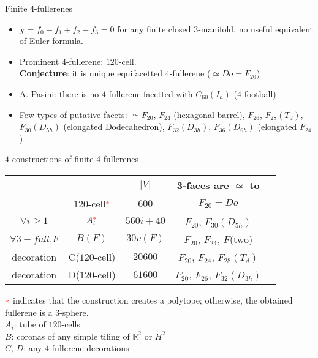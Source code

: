 \documentclass[%
pdf,
colorBG,
slideColor,
]{prosper}
\newcommand{\RR}{\ensuremath{\mathbb{R}}}
\begin{document}
\begin{slide}{Finite $4$-fullerenes}
\begin{itemize}
\item $\chi=f_0-f_1+f_2-f_3=0$ for any finite closed $3$-manifold, no useful equivalent of Euler formula.

\item Prominent $4$-fullerene: $120$-cell.\\
{\bf Conjecture}: it is unique equifacetted $4$-fullerene ($\simeq Do=F_{20}$)

\item A. Pasini: there is no $4$-fullerene facetted with
$C_{60}(I_h)$ ($4$-football)

\item Few types of putative facets: $\simeq
F_{20}$, $F_{24}$ (hexagonal barrel), $F_{26}$, $F_{28}(T_d)$,
$F_{30}(D_{5h})$ (elongated Dodecahedron), $F_{32}(D_{3h})$,
$F_{36}(D_{6h})$ (elongated $F_{24}$)
\end{itemize}
\end{slide}





\begin{slide}{$4$ constructions of finite 4-fullerenes}
\begin{center}
\begin{tabular}{|c|c|c|c|c|}
\hline
     &    &$|V|$&3-faces are $\simeq$ to\\
\hline
     &$120$-cell${}^{\textcolor{red}{*}}$   & $600$   &  $F_{20}=Do$\\
$\forall i\geq 1$
  & $A_i^{\textcolor{red}{*}}$ & $560i+40$   &$F_{20}$, $F_{30}(D_{5h})$\\
$\forall 3-full. F$ & $B(F)$ & $30 v(F)$  &$F_{20}$, $F_{24}$, $F$(two)\\
decoration &C($120$-cell) & $20600$  & $F_{20}$, $F_{24}$, $F_{28}(T_d)$\\
decoration &D($120$-cell) & $61600$  & $F_{20}$, $F_{26}$, $F_{32}(D_{3h})$\\
\hline
\end{tabular}
\end{center}
$\textcolor{red}{*}$ indicates that the construction creates a polytope; otherwise, the obtained fullerene is a $3$-sphere.\\
$A_i$: tube of $120$-cells\\
$B$: coronas of any simple tiling of $\RR^2$ or $H^2$\\
$C$, $D$: any $4$-fullerene decorations

\end{slide}
\end{document}
